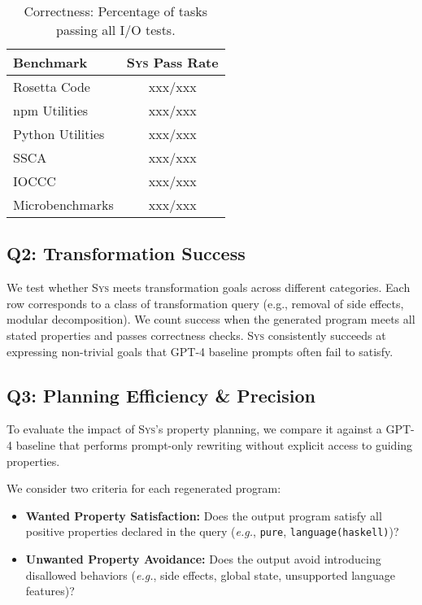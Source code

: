 \documentclass[sigplan]{acmart}
\def\eg{{\em e.g.}, }
\newcommand{\sys}{{\scshape Sys}\xspace}
\newcommand{\xxx}{\colorbox{red!30}{xxx}\xspace}
\begin{document}
\begin{table}[h]
  \centering
  \caption{Correctness: Percentage of tasks passing all I/O tests.}
  \begin{tabular}{lc}
    \toprule
    Benchmark & \sys Pass Rate \\ 
    \midrule
    Rosetta Code & \xxx/\xxx  \\
    npm Utilities & \xxx/\xxx \\
    Python Utilities & \xxx/\xxx \\
    SSCA & \xxx/\xxx  \\
    IOCCC & \xxx/\xxx  \\
    Microbenchmarks & \xxx/\xxx  \\
    \bottomrule
  \end{tabular}
\end{table}

\subsection{Q2: Transformation Success}

We test whether \sys meets transformation goals across different categories.
Each row corresponds to a class of transformation query (e.g., removal of side effects, modular decomposition).
We count success when the generated program meets all stated properties and passes correctness checks.
\sys consistently succeeds at expressing non-trivial goals that GPT-4 baseline prompts often fail to satisfy.

\subsection{Q3: Planning Efficiency \& Precision}

To evaluate the impact of \sys's property planning, we compare it against a GPT-4 baseline that performs prompt-only rewriting without explicit access to guiding properties.

We consider two criteria for each regenerated program:

\begin{itemize}
  \item \textbf{Wanted Property Satisfaction:} Does the output program satisfy all positive properties declared in the query (\eg \texttt{pure}, \texttt{language(haskell)})?
  \item \textbf{Unwanted Property Avoidance:} Does the output avoid introducing disallowed behaviors (\eg side effects, global state, unsupported language features)?
\end{itemize}
\end{document}
